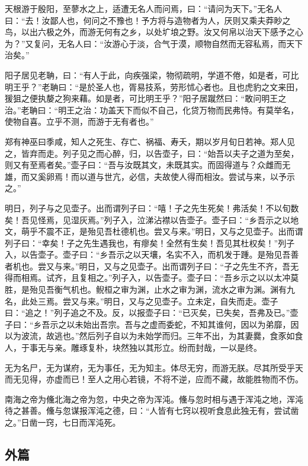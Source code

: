 \documentclass[]{article}
\begin{document}
天根游于殷阳，至蓼水之上，适遭无名人而问焉，曰：``请问为天下。''无名人曰：``去！汝鄙人也，何问之不豫也！予方将与造物者为人，厌则又乘夫莽眇之鸟，以出六极之外，而游无何有之乡，以处圹埌之野。汝又何帛以治天下感予之心为？''又复问，无名人曰：``汝游心于淡，合气于漠，顺物自然而无容私焉，而天下治矣。''

阳子居见老聃，曰：``有人于此，向疾强梁，物彻疏明，学道不倦，如是者，可比明王乎？''老聃曰：``是於圣人也，胥易技系，劳形怵心者也。且也虎豹之文来田，猨狙之便执嫠之狗来藉。如是者，可比明王乎？''阳子居蹴然曰：``敢问明王之治。''老聃曰：``明王之治：功盖天下而似不自己，化贷万物而民弗恃。有莫举名，使物自喜。立乎不测，而游于无有者也。''

郑有神巫曰季咸，知人之死生、存亡、祸福、寿夭，期以岁月旬日若神。郑人见之，皆弃而走。列子见之而心醉，归，以告壶子，曰：``始吾以夫子之道为至矣，则又有至焉者矣。''壶子曰：``吾与汝既其文，未既其实。而固得道与？众雌而无雄，而又奚卵焉！而以道与世亢，必信，夫故使人得而相汝。尝试与来，以予示之。''

明日，列子与之见壶子。出而谓列子曰：``嘻！子之先生死矣！弗活矣！不以旬数矣！吾见怪焉，见湿灰焉。''列子入，泣涕沾襟以告壶子。壶子曰：``乡吾示之以地文，萌乎不震不正，是殆见吾杜德机也。尝又与来。''明日，又与之见壶子。出而谓列子曰：``幸矣！子之先生遇我也，有瘳矣！全然有生矣！吾见其杜权矣！''列子入，以告壶子。壶子曰：``乡吾示之以天壤，名实不入，而机发于踵。是殆见吾善者机也。尝又与来。''明日，又与之见壶子。出而谓列子曰：``子之先生不齐，吾无得而相焉。试齐，且复相之。''列子入，以告壶子。壶子曰：``吾乡示之以以太冲莫胜，是殆见吾衡气机也。鲵桓之审为渊，止水之审为渊，流水之审为渊。渊有九名，此处三焉。尝又与来。''明日，又与之见壶子。立未定，自失而走。壶子曰：``追之！''列子追之不及。反，以报壶子曰：``已灭矣，已失矣，吾弗及已。''壶子曰：``乡吾示之以未始出吾宗。吾与之虚而委蛇，不知其谁何，因以为弟靡，因以为波流，故逃也。''然后列子自以为未始学而归。三年不出，为其妻爨，食豕如食人，于事无与亲。雕琢复朴，块然独以其形立。纷而封哉，一以是终。

无为名尸，无为谋府，无为事任，无为知主。体尽无穷，而游无朕。尽其所受乎天而无见得，亦虚而已！至人之用心若镜，不将不逆，应而不藏，故能胜物而不伤。

南海之帝为儵北海之帝为忽，中央之帝为浑沌。儵与忽时相与遇于浑沌之地，浑沌待之甚善。儵与忽谋报浑沌之德，曰：``人皆有七窍以视听食息此独无有，尝试凿之。''日凿一窍，七日而浑沌死。

\hypertarget{header-n181}{%
\subsection{外篇}\label{header-n181}}
\end{document}
